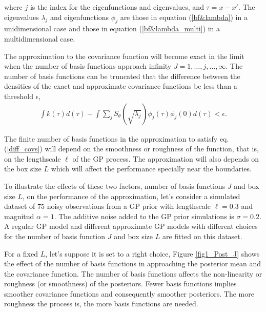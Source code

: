 \documentclass[]{interact}
\theoremstyle{plain}%
\theoremstyle{definition}
\theoremstyle{remark}
\begin{document}
\noindent where $j$ is the index for the eigenfunctions and eigenvalues, and $\tau=x-x'$. The eigenvalues $\lambda_j$ and eigenfunctions $\phi_j$ are those in equation (\ref{bf&lambda}) in a unidimensional case and those in equation (\ref{bf&lambda_multi}) in a multidimensional case.

The approximation to the covariance function will become exact in the limit when the number of basis functions approach infinity $J=1,\dots,j,\dots,\infty$. The number of basis functions can be truncated that the difference between the densities of the exact and approximate covariance functions be less than a threshold $\epsilon$,
%
\begin{eqnarray}\label{diff_covs}
\int k(\tau)d(\tau) - \int \sum_{j}S_{\theta}(\sqrt{\lambda_j}) \phi_j(\tau) \phi_j(0) d(\tau) < \epsilon.
\end{eqnarray}

The finite number of basis functions in the approximation to satisfy eq. (\ref{diff_covs}) will depend on the smoothness or roughness of the function, that is, on the lengthscale $\ell$ of the GP process. The approximation will also depends on the box size $L$ which will affect the performance specially near the boundaries. 

To illustrate the effects of these two factors, number of basis functions $J$ and box size $L$, on the performance of the approximation, let's consider a simulated dataset of 75 noisy observations from a GP prior with lengthscale $\ell=0.3$ and magnitud $\alpha=1$. The additive noise added to the GP prior simulations is $\sigma=0.2$. A regular GP model and different approximate GP models with different choices for the number of basis function $J$ and box size $L$ are fitted on this dataset. 

For a fixed $L$, let's suppose it is set to a right choice, Figure \ref{fig1_Post_J} shows the effect of the number of basis functions in approaching the posterior mean and the covariance function. The number of basis functions affects the non-linearity or roughness (or smoothness) of the posteriors. Fewer basis functions implies smoother covariance functions and consequently smoother posteriors. The more roughness the process is, the more basis functions are needed. 
\end{document}
